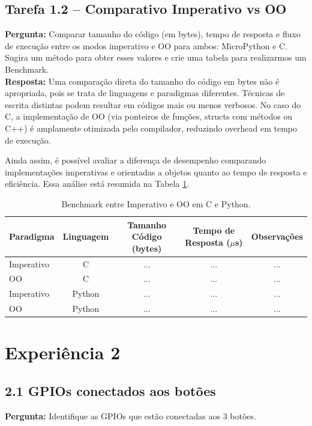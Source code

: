 \documentclass{article}
\begin{document}
\subsection{Tarefa 1.2 -- Comparativo Imperativo vs OO}
\textbf{Pergunta:} Comparar tamanho do código (em bytes), tempo de resposta e fluxo de execução entre os modos imperativo e OO para ambos: MicroPython e C. Sugira um método para obter esses valores e crie uma tabela para realizarmos um Benchmark.  \\

\textbf{Resposta:}  
Uma comparação direta do tamanho do código em bytes não é apropriada, pois se trata de linguagens e paradigmas diferentes. Técnicas de escrita distintas podem resultar em códigos mais ou menos verbosos. No caso do C, a implementação de OO (via ponteiros de funções, structs com métodos ou C++) é amplamente otimizada pelo compilador, reduzindo overhead em tempo de execução.  

Ainda assim, é possível avaliar a diferença de desempenho comparando implementações imperativas e orientadas a objetos quanto ao tempo de resposta e eficiência. Essa análise está resumida na Tabela \ref{tab:benchmark_oo}.  

\begin{table}[H]
    \centering
    \label{tab:benchmark_oo}
    \begin{tabular}{lcccc}
        \toprule
        Paradigma & Linguagem & Tamanho Código (bytes) & Tempo de Resposta ($\mu$s) & Observações \\
        \midrule
        Imperativo & C        & ... & ... & ... \\
        OO         & C        & ... & ... & ... \\
        Imperativo & Python   & ... & ... & ... \\
        OO         & Python   & ... & ... & ... \\
        \bottomrule
    \end{tabular}
    \caption{Benchmark entre Imperativo e OO em C e Python.}
\end{table}

\section{Experiência 2}

\subsection{2.1 GPIOs conectados aos botões}
\textbf{Pergunta:} Identifique as GPIOs que estão conectadas aos 3 botões.  
\end{document}
